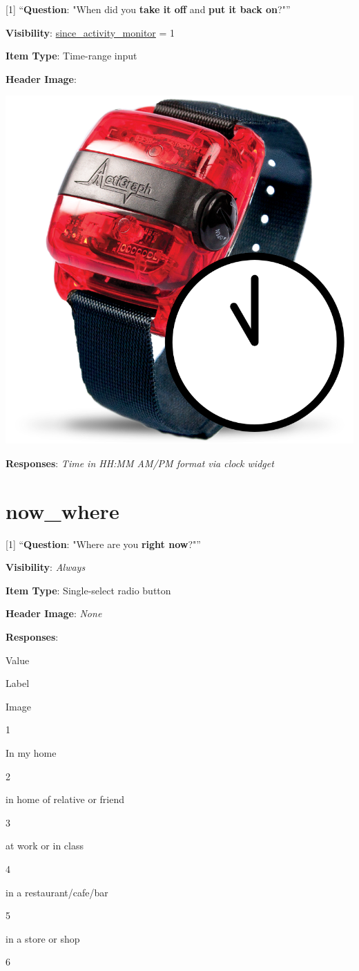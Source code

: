 \documentclass[]{book}
\begin{document}
{[}1{]} ``\textbf{Question}: "When did you \textbf{take it off} and \textbf{put it back on}?"''

\textbf{Visibility}: \protect\hyperlink{since_activity_monitor}{since\_activity\_monitor} = 1

\textbf{Item Type}: Time-range input

\textbf{Header Image}:

\begin{flushleft}\includegraphics[width=0.33\linewidth]{downloadFigs4latex_NIMH_Applet_Codebook/since_activity_monitor_time_headerImg} \end{flushleft}

\textbf{Responses}: \emph{Time in HH:MM AM/PM format via clock widget}

\hypertarget{now_where}{%
\section{now\_where}\label{now_where}}

{[}1{]} ``\textbf{Question}: "Where are you \textbf{right now}?"''

\textbf{Visibility}: \emph{Always}

\textbf{Item Type}: Single-select radio button

\textbf{Header Image}: \emph{None}

\textbf{Responses}:

Value

Label

Image

1

In my home

2

in home of relative or friend

3

at work or in class

4

in a restaurant/cafe/bar

5

in a store or shop

6
\end{document}
